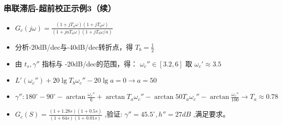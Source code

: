\documentclass[table]{beamer}
\begin{document}
\begin{frame}
\frametitle{串联滞后-超前校正示例3（续）}
\label{sec-2-8}

\begin{itemize}
\item $G_c(j\omega)=\frac{(1+jT_a\omega)(1+jT_b\omega)}{(1+jaT_a\omega)(1+jT_b\omega/a)}$
\item 分析-20dB/dec与-40dB/dec转折点，得 $T_b=\frac{1}{2}$
\item 由 $t_s,\gamma''$ 指标与 -20dB/dec的范围，得： $\omega_c'' \in [3.2,6]$ 取 $\omega_c'\approx 3.5$
\item $L'(\omega_c'')+20\lg T_b\omega_c''-20\lg a=0\to a=50$
\item $\gamma'': 180^{\circ}-90^{\circ}-\arctan \frac{\omega_c''}{6}+\arctan T_a\omega_c''-\arctan 50T_a\omega_c''-\arctan\frac{\omega_c''}{100}\to T_a\approx 0.78$
\item $G_c(S)=\frac{(1+1.28s)(1+0.5s)}{(1+64s)(1+0.01s)}$ ,验证: $\gamma''=45.5^{\circ},h''=27dB$ ,满足要求。
\end{itemize}
\end{frame}
\end{document}
